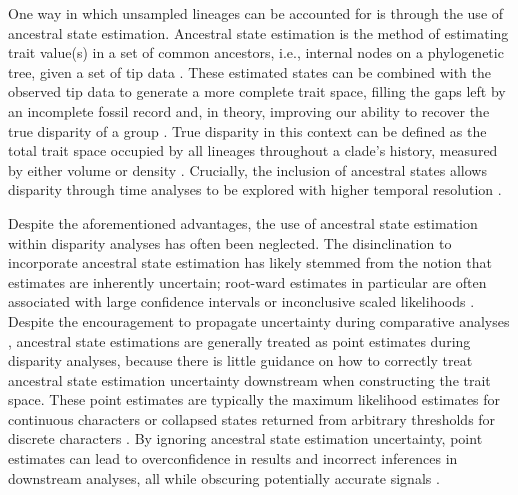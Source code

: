 \documentclass[11pt, a4paper]{article}
\newcommand{\ASE}{Ancestral state estimation }
\newcommand{\ase}{ancestral state estimation }
\begin{document}
One way in which unsampled lineages can be accounted for is through the use of ancestral state estimation.
\ASE is the method of estimating trait value(s) in a set of common ancestors, i.e., internal nodes on a phylogenetic tree, given a set of tip data \citep{schluter1997likelihood,cunningham1998reconstructing,revell2025ancestral}.
These estimated states can be combined with the observed tip data to generate a more complete trait space, filling the gaps left by an incomplete fossil record and, in theory, improving our ability to recover the true disparity of a group \citep{sidlauskas2008continuous,brusatte2011phylogenetic,lloyd2018journeys}.
True disparity in this context can be defined as the total trait space occupied by all lineages throughout a clade's history, measured by either volume or density \citep{guillerme2020shifting}.
Crucially, the inclusion of ancestral states allows disparity through time analyses to be explored with higher temporal resolution \citep{brusatte2011phylogenetic, halliday2016eutherian, guillerme2018time}.

Despite the aforementioned advantages, the use of \ase within disparity analyses has often been neglected.
The disinclination to incorporate \ase has likely stemmed from the notion that estimates are inherently uncertain; root-ward estimates in particular are often associated with large confidence intervals or inconclusive scaled likelihoods \citep{schluter1997likelihood, losos1999uncertainty,gascuel2014predicting}.
Despite the encouragement to propagate uncertainty during comparative analyses \citep{silvestro2015measurement,boyko2024dentist}, ancestral state estimations are generally treated as point estimates during disparity analyses, because there is little guidance on how to correctly treat \ase uncertainty downstream when constructing the trait space. %
These point estimates are typically the maximum likelihood estimates for continuous characters or collapsed states returned from arbitrary thresholds for discrete characters \citep{smith2022evolution,casali2023morphological, li2026morphological}.
By ignoring ancestral state estimation uncertainty, point estimates can lead to overconfidence in results and incorrect inferences in downstream analyses, all while obscuring potentially accurate signals \citep{ackerly2006niche,vanderpoorten2006mapping}.
\end{document}
